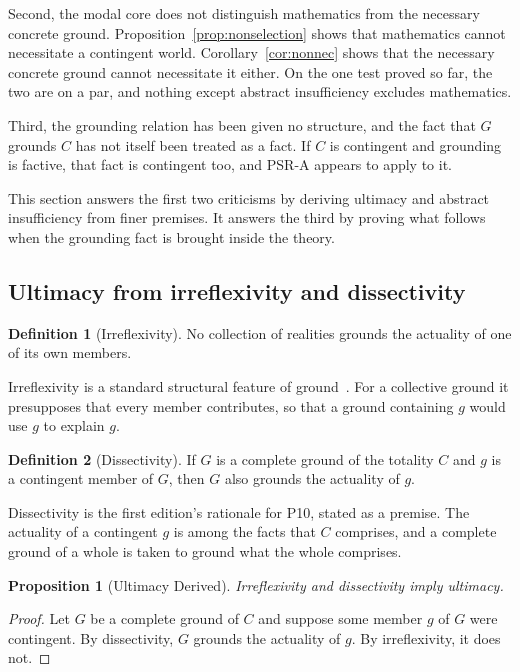 \documentclass[11pt,letterpaper]{article}
\theoremstyle{plain}
\newtheorem{proposition}{Proposition}
\theoremstyle{definition}
\newtheorem{definition}{Definition}
\begin{document}
Second, the modal core does not distinguish mathematics from the necessary concrete ground. Proposition~\ref{prop:nonselection} shows that mathematics cannot necessitate a contingent world. Corollary~\ref{cor:nonnec} shows that the necessary concrete ground cannot necessitate it either. On the one test proved so far, the two are on a par, and nothing except abstract insufficiency excludes mathematics.

Third, the grounding relation has been given no structure, and the fact that $G$ grounds $C$ has not itself been treated as a fact. If $C$ is contingent and grounding is factive, that fact is contingent too, and PSR-A appears to apply to it.

This section answers the first two criticisms by deriving ultimacy and abstract insufficiency from finer premises. It answers the third by proving what follows when the grounding fact is brought inside the theory.

\subsection{Ultimacy from irreflexivity and dissectivity}

\begin{definition}[Irreflexivity]\label{def:irr}
No collection of realities grounds the actuality of one of its own members.
\end{definition}

Irreflexivity is a standard structural feature of ground~\cite{fine}. For a collective ground it presupposes that every member contributes, so that a ground containing $g$ would use $g$ to explain $g$.

\begin{definition}[Dissectivity]\label{def:dis}
If $G$ is a complete ground of the totality $C$ and $g$ is a contingent member of $G$, then $G$ also grounds the actuality of $g$.
\end{definition}

Dissectivity is the first edition's rationale for P10, stated as a premise. The actuality of a contingent $g$ is among the facts that $C$ comprises, and a complete ground of a whole is taken to ground what the whole comprises.

\begin{proposition}[Ultimacy Derived]\label{prop:ultimacy}
Irreflexivity and dissectivity imply ultimacy.
\end{proposition}

\begin{proof}
Let $G$ be a complete ground of $C$ and suppose some member $g$ of $G$ were contingent. By dissectivity, $G$ grounds the actuality of $g$. By irreflexivity, it does not.
\end{proof}
\end{document}
